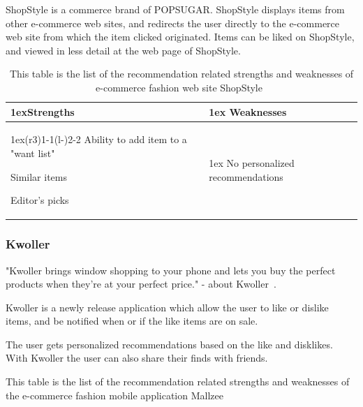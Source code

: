     ShopStyle is a commerce brand of POPSUGAR.
    ShopStyle displays items from other e-commerce web sites, and redirects the user directly to the e-commerce web site from which the item clicked originated.
    Items can be liked on ShopStyle, and viewed in less detail at the web page of ShopStyle.
    \begin{table}[H]
                    \centering
                    \begin{tabularx}{\linewidth}{>{\parskip1ex}X@{\kern4\tabcolsep}>{\parskip1ex}X}
                    \toprule
                    \hfil\bfseries Strengths
                    &
                    \hfil\bfseries Weaknesses
                    \\\cmidrule(r{3\tabcolsep}){1-1}\cmidrule(l{-\tabcolsep}){2-2}
                Ability to add item to a "want list" \par
                Similar items \par
                Editor's picks \par
            &
                No personalized recommendations \par
            \\ \bottomrule
        \end{tabularx}
        \caption[Recommendation related strengths and weaknesses of ShopStyle~\cite{ShopStyle}]{This table is the list of the recommendation related strengths and weaknesses of e-commerce fashion web site ShopStyle~\cite{ShopStyle}}
        \label{table:ecommenreceShopStyle}
    \end{table}

\subsubsection{Kwoller}
\label{par:Kwoller}

"Kwoller brings window shopping to your phone and lets you buy the perfect products when they’re at your perfect price." - about Kwoller~\cite{kwoller}.

Kwoller is a newly release application which allow the user to like or dislike items, and be notified when or if the like items are on sale.

The user gets personalized recommendations based on the like and disklikes.
With Kwoller the user can also share their finds with friends.

This table is the list of the recommendation related strengths and weaknesses
of the e-commerce fashion mobile application Mallzee~\cite{kwoller}

